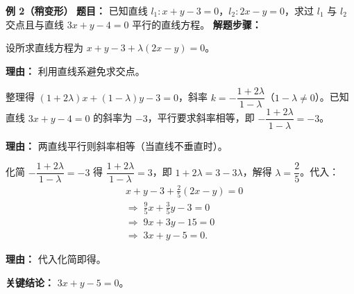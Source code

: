 \begin{examplebox}
	\medskip
	\textbf{\textcolor{CExample}{例 2（稍变形）}}
	\textbf{\textcolor{CExample}{题目：}}
	已知直线 $l_1: x+y-3=0$，$l_2: 2x-y=0$，求过 $l_1$ 与 $l_2$ 交点且与直线 $3x+y-4=0$ 平行的直线方程。
	\textbf{\textcolor{CExample}{解题步骤：}}
	\begin{description}[style=nextline, leftmargin=2.8em, labelsep=0.5em, itemsep=0.45em]
		\item[\textbf{第一步（设直线系）：}]
			设所求直线方程为 $x+y-3+\lambda(2x-y)=0$。
			\par\textbf{理由：} 利用直线系避免求交点。
		\item[\textbf{第二步（列平行条件）：}]
			整理得 $(1+2\lambda)x+(1-\lambda)y-3=0$，斜率 $k=-\dfrac{1+2\lambda}{1-\lambda}$（$1-\lambda\neq0$）。已知直线 $3x+y-4=0$ 的斜率为 $-3$，平行要求斜率相等，即 $-\dfrac{1+2\lambda}{1-\lambda} = -3$。
			\par\textbf{理由：} 两直线平行则斜率相等（当直线不垂直时）。
		\item[\textbf{第三步（解 $\lambda$ 并回代）：}]
			化简 $-\dfrac{1+2\lambda}{1-\lambda}=-3$ 得 $\dfrac{1+2\lambda}{1-\lambda}=3$，即 $1+2\lambda=3-3\lambda$，解得 $\lambda=\dfrac25$。代入：
			\[
				\begin{aligned}
					& x+y-3+\frac25(2x-y)=0 \\ & \Longrightarrow\; \frac95x+\frac35y-3=0 \\ & \Longrightarrow\; 9x+3y-15=0 \\ & \Longrightarrow\; 3x+y-5=0 .
			\end{aligned}
			\]
			\par\textbf{理由：} 代入化简即得。
	\end{description}
	\textbf{\textcolor{CExample}{关键结论：}}
	$\boxed{3x+y-5=0}$。


\end{examplebox}
